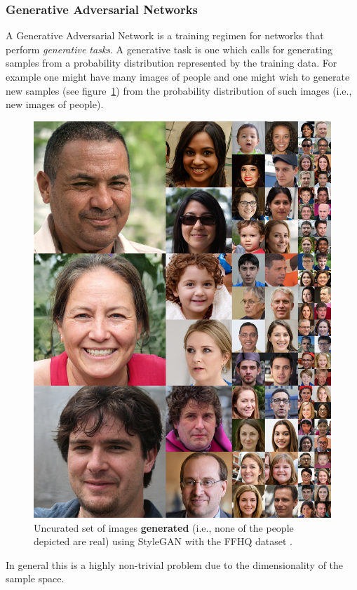 \subsubsection{Generative Adversarial Networks}\label{subsubsec:gan}
A Generative Adversarial Network \cite{goodfellow2014generative} is a training regimen for networks that perform \textit{generative tasks}.
%
A generative task is one which calls for generating samples from a probability distribution represented by the training data.
%
For example one might have many images of people and one might wish to generate new samples (see figure~\ref{fig:stylegan}) from the probability distribution of such images (i.e., new images of people).
\begin{figure}
    \centering
    \begin{adjustbox}{width=\linewidth}
        \centering
        \includegraphics[]{figures/neural_networks/stylegan.jpg}
    \end{adjustbox}
    \caption{Uncurated set of images \textbf{generated} (i.e., none of the people depicted are real) using StyleGAN with the FFHQ dataset \cite{karras2018stylebased}.}\label{fig:stylegan}
\end{figure}
%
In general this is a highly non-trivial problem due to the dimensionality of the sample space.

